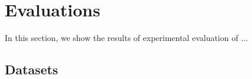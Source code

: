 \section{Evaluations}
\label{evaluation}

In this section, we show the results of experimental evaluation of ...

\subsection{Datasets}
\label{eval_datasets}


